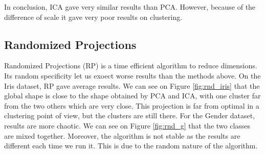 \documentclass[twocolumn, 10pt]{article}
\begin{document}
			In conclusion, ICA gave very similar results than PCA. However, because of the difference of scale it gave very poor results on clustering.
		\subsection{Randomized Projections}
			Randomized Projections (RP) is a time efficient algorithm to reduce dimensions. Its random specificity let us exoect worse results than the methods above. On the Iris dataset, RP gave average results. We can see on Figure \ref{fig:rnd_iris} that the global shape is close to the shape obtained by PCA and ICA, with one cluster far from the two others which are very close. This projection is far from optimal in a clustering point of view, but the clusters are still there. For the Gender dataset, results are more chaotic. We can see on Figure \ref{fig:rnd_g} that the two classes are mixed together. Moreover, the algorithm is not stable as the results are different each time we run it. This is due to the random nature of the algorithm.
\end{document}
